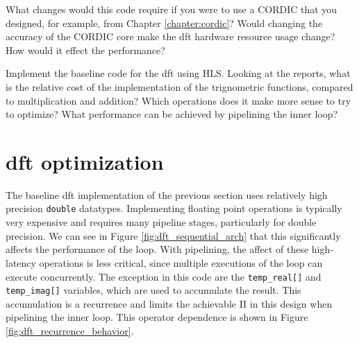 
\begin{exercise}
What changes would this code require if you were to use a CORDIC that you designed, for example, from Chapter \ref{chapter:cordic}? Would changing the accuracy of the CORDIC core make the \gls{dft} hardware resource usage change? How would it effect the performance? 
\end{exercise}

\begin{exercise}
Implement the baseline code for the \gls{dft} using HLS.  Looking at the reports, what is the relative cost of the implementation of the trignometric functions, compared to multiplication and addition?  Which operations does it make more sense to try to optimize?  What performance can be achieved by pipelining the inner loop?
\end{exercise}

\section{\gls{dft} optimization}
\label{subsec:dft_optimization}

The baseline \gls{dft} implementation of the previous section uses relatively high precision \lstinline|double| datatypes.  Implementing floating point operations is typically very expensive and requires many pipeline stages, particularly for double precision.  We can see in Figure \ref{fig:dft_sequential_arch} that this significantly affects the performance of the loop.  With pipelining, the affect of these high-latency operations is less critical, since multiple executions of the loop can execute concurrently.  The exception in this code are the \lstinline|temp_real[]| and \lstinline|temp_imag[]| variables, which are used to accumulate the result.  This accumulation is a \gls{recurrence} and limits the achievable II in this design when pipelining the inner loop.   This operator dependence is shown in Figure \ref{fig:dft_recurrence_behavior}.

